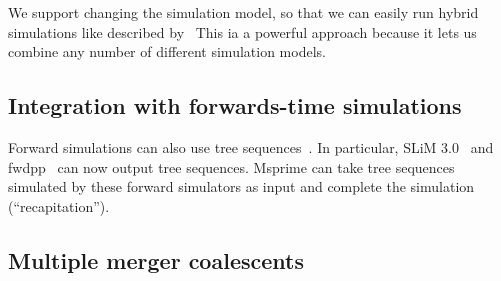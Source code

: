 \documentclass{article}
\begin{document}
We support changing the simulation model, so that we can easily
run hybrid simulations like described by~\cite{bhaskar2014distortion}
This ia a powerful approach because it lets us combine any
number of different simulation models.

\subsection*{Integration with forwards-time simulations}
Forward simulations can also use tree
sequences~\citep{kelleher2018efficient,haller2018tree}. In particular,
SLiM 3.0~\citep{haller2019slim} and fwdpp~\citep{thornton2014cpp} can now output tree sequences.
Msprime can take tree sequences simulated by these forward simulators
as input and complete the simulation (``recapitation'').

\subsection*{Multiple merger coalescents}

\label{mmc}%
\end{document}
